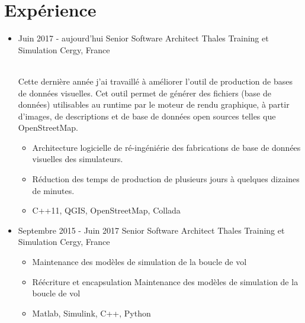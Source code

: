 
\section{Expérience}


\begin{itemize}

\item{
\cventrylc
{Juin 2017 - aujourd'hui} %
{Senior Software Architect} %
{Thales Training et Simulation} %
{Cergy, France} %
{}
{ %
\\[6pt]
Cette dernière année j'ai travaillé à améliorer l'outil de production de bases de données visuelles. Cet outil permet de générer des fichiers
(base de données) utilisables au runtime par le moteur de rendu graphique, à partir d'images, de descriptions et de base de données open sources
telles que OpenStreetMap.
\\[6pt]
\begin{itemize}
\item {Architecture logicielle de ré-ingéniérie des fabrications de base de données visuelles des simulateurs.}
\item {Réduction des temps de production de plusieurs jours à quelques dizaines de minutes.}
\item {C++11, QGIS, OpenStreetMap, Collada}
\end{itemize}
}
{
}
}
\item{
\cventrylc
{Septembre 2015 - Juin 2017} %
{Senior Software Architect} %
{Thales Training et Simulation} %
{Cergy, France} %
{}
{ %
\begin{itemize}
\item {Maintenance des modèles de simulation de la boucle de vol}
\item {Réécriture et encapsulation Maintenance des modèles de simulation de la boucle de vol}
\item {Matlab, Simulink, C++, Python}
\end{itemize}
}
}




\end{itemize}